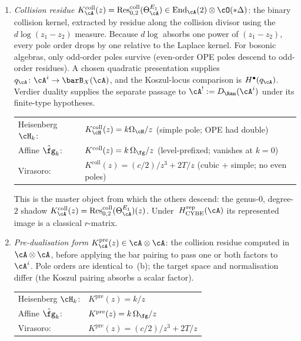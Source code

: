 \begin{remark}
\begin{enumerate}[label=\textup{(\alph*)}]
\item \emph{Collision residue}
 $K^{\mathrm{coll}}_\cA(z)
 = \operatorname{Res}^{\mathrm{coll}}_{0,2}(\Theta_\cA^{E_1})
 \in \operatorname{End}_\cA(2)\otimes\cO(*\Delta)$:
 the binary collision kernel, extracted by residue along the
 collision divisor using the $d\log(z_1-z_2)$ measure.
 Because $d\log$ absorbs one power of $(z_1-z_2)$, every pole order
 drops by one relative to the Laplace kernel.
 For bosonic algebras, only odd-order poles survive
 (even-order OPE poles descend to odd-order residues).
 A chosen quadratic presentation supplies
 $q_\cA\colon\cA^i\to\barB_X(\cA)$, and the Koszul-locus comparison is
 $H^\bullet(q_\cA)$.  Verdier duality supplies the separate passage to
 $\cA^!:=D_{\Ran}(\cA^i)$ under its finite-type hypotheses.
 \begin{center}
 \renewcommand{\arraystretch}{1.1}
 \begin{tabular}{ll}
 Heisenberg $\cH_k$\textup: &
 $K^{\mathrm{coll}}_{\cH}(z) = k\Omega_{\cH}/z$
 \quad\textup{(simple pole; OPE had double)} \\
 Affine $\hat\fg_k$\textup: &
 $K^{\mathrm{coll}}(z)
 = k\,\Omega_\fg/z$
 \quad\textup{(level-prefixed; vanishes at $k=0$)} \\
 Virasoro\textup: &
 $K^{\mathrm{coll}}(z) = (c/2)/z^3 + 2T/z$
 \quad\textup{(cubic + simple; no even poles)}
 \end{tabular}
 \end{center}
 This is the master object from which the others descend:
 the genus-$0$, degree-$2$ shadow
 $K^{\mathrm{coll}}_\cA(z)
 =\operatorname{Res}^{\mathrm{coll}}_{0,2}(\Theta_\cA^{E_1})(z)$.
 Under~$H_{\mathrm{CYBE}}^{\mathrm{rep}}(\cA)$ its represented
 image is a classical $r$-matrix.

\item \emph{Pre-dualisation form}
 $K^{\mathrm{pre}}_\cA(z) \in \cA\otimes\cA$:
 the collision residue computed in $\cA\otimes\cA$, before
 applying the bar pairing to pass one or both factors to~$\cA^i$.
 Pole orders are identical to~\textup{(b)};
 the target space and normalisation differ
 \textup{(}the Koszul pairing absorbs a scalar factor\textup{)}.
 \begin{center}
 \renewcommand{\arraystretch}{1.1}
 \begin{tabular}{ll}
 Heisenberg $\cH_k$\textup: &
 $K^{\mathrm{pre}}(z) = k/z$ \\
 Affine $\hat\fg_k$\textup: &
 $K^{\mathrm{pre}}(z) = k\,\Omega_\fg/z$ \\
 Virasoro\textup: &
 $K^{\mathrm{pre}}(z) = (c/2)/z^3 + 2T/z$
 \end{tabular}
 \end{center}
\end{enumerate}


\end{remark}
